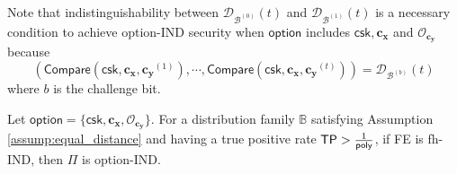 Note that indistinguishability between $\mathcal{D}_{ \mathcal{B}^{(0)} }(t)$ and $\mathcal{D}_{ \mathcal{B}^{(1)} }(t)$ is a necessary condition to achieve \textsf{option}-IND security when $\textsf{option}$ includes $\textsf{csk}, \mathbf{c_x}$ and $\mathcal{O}_{\mathbf{c_y}}$ because
\[
	\left( \textsf{Compare}(\textsf{csk}, \mathbf{c_x}, \mathbf{c_y}^{(1)}), \cdots, \textsf{Compare}(\textsf{csk}, \mathbf{c_x}, \mathbf{c_y}^{(t)}) \right) = \mathcal{D}_{ \mathcal{B}^{(b)} }(t)
\]
where $b$ is the challenge bit.


\begin{theorem}
\label{thm:fh-IPFE:ind-ind}
Let $\textsf{option} = \{ \textsf{csk}, \mathbf{c_x},  \mathcal{O}_{\mathbf{c_y}} \}.$ For a distribution family $\mathbb{B}$ satisfying Assumption \ref{assump:equal_distance} and having a true positive rate $\textsf{TP} > \frac{1}{\mathsf{poly}}$, if \textsf{FE} is fh-IND, then $\Pi$ is \textsf{option}-IND.

\end{theorem}



